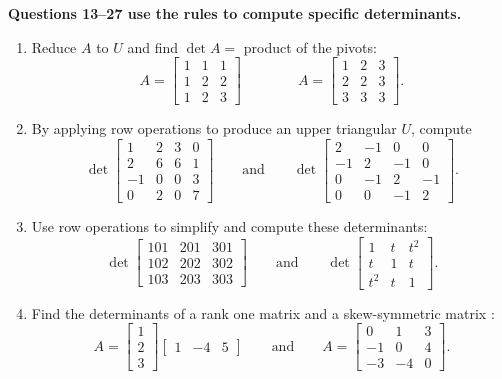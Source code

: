 \documentclass[14pt, a4paper]{article}
\begin{document}
\noindent \textbf{Questions 13--27 use the rules to compute specific determinants.}

\begin{enumerate}[resume]
    \item Reduce $A$ to $U$ and find $\det A =$ product of the pivots:
          \[
              A = \begin{bmatrix} 1 & 1 & 1 \\ 1 & 2 & 2 \\ 1 & 2 & 3 \end{bmatrix} \qquad \qquad
              A = \begin{bmatrix} 1 & 2 & 3 \\ 2 & 2 & 3 \\ 3 & 3 & 3 \end{bmatrix}.
          \]

    \item By applying row operations to produce an upper triangular $U$, compute
          \[
              \det \begin{bmatrix} 1 & 2 & 3 & 0 \\ 2 & 6 & 6 & 1 \\ -1 & 0 & 0 & 3 \\ 0 & 2 & 0 & 7 \end{bmatrix}
              \qquad \text{and} \qquad
              \det \begin{bmatrix} 2 & -1 & 0 & 0 \\ -1 & 2 & -1 & 0 \\ 0 & -1 & 2 & -1 \\ 0 & 0 & -1 & 2 \end{bmatrix}.
          \]

    \item Use row operations to simplify and compute these determinants:
          \[
              \det \begin{bmatrix} 101 & 201 & 301 \\ 102 & 202 & 302 \\ 103 & 203 & 303 \end{bmatrix}
              \qquad \text{and} \qquad
              \det \begin{bmatrix} 1 & t & t^2 \\ t & 1 & t \\ t^2 & t & 1 \end{bmatrix}.
          \]

    \item Find the determinants of a rank one matrix and a skew-symmetric matrix :
          \[
              A = \begin{bmatrix} 1 \\ 2 \\ 3 \end{bmatrix} \begin{bmatrix} 1 & -4 & 5 \end{bmatrix}
              \qquad \text{and} \qquad
              A = \begin{bmatrix} 0 & 1 & 3 \\ -1 & 0 & 4 \\ -3 & -4 & 0 \end{bmatrix}.
          \]


\end{enumerate}
\end{document}
